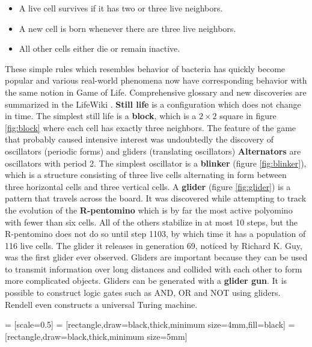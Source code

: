\begin{itemize}
  \item A live cell survives if it has two or three live neighbors.
  \item A new cell is born whenever there are three live neighbors.
  \item All other cells either die or remain inactive.
\end{itemize}

These simple rules which resembles behavior of bacteria has quickly become popular and various real-world phenomena now have corresponding behavior with the same notion in Game of Life. Comprehensive glossary and new discoveries are summarized in the LifeWiki \cite{LifeWiki}.
{\bf Still life} is a configuration which does not change in time. The simplest still life is a {\bf block}, which is a $2\times 2$ square in figure \ref{fig:block} where each cell has exactly three neighbors.
The feature of the game that probably caused intensive interest was undoubtedly the discovery of oscillators (periodic forms) and gliders (translating oscillators)
{\bf Alternators} are oscillators with period 2. The simplest oscillator is a {\bf blinker} (figure \ref{fig:blinker}), which is a structure consisting of three live cells alternating in form between three horizontal cells and three vertical cells.
A {\bf glider} (figure \ref{fig:glider}) is a pattern that travels across the board. It was discovered while attempting to track the evolution of the {\bf R-pentomino} which is by far the most active polyomino with fewer than six cells. All of the others stabilize in at most 10 steps, but the R-pentomino does not do so until step 1103, by which time it has a population of 116 live cells. The glider it releases in generation 69, noticed by Richard K. Guy, was the first glider ever observed. Gliders are important because they can be used to transmit information over long distances and collided with each other to form more complicated objects. Gliders can be generated with a {\bf glider gun}. It is possible to construct logic gates such as AND, OR and NOT using gliders. Rendell \cite{Rendell15LifeUniversal} even constructs a universal Turing machine.

 = [scale=0.5]
 = [rectangle,draw=black,thick,minimum size=4mm,fill=black]
 = [rectangle,draw=black,thick,minimum size=5mm]
\newcommand{\conwaygrid}[2]{
  \foreach \x in {1,...,#1}{
      \foreach \y in {1,...,#2}
        \node[emptycell] at (\x,\y){};
  }
}

